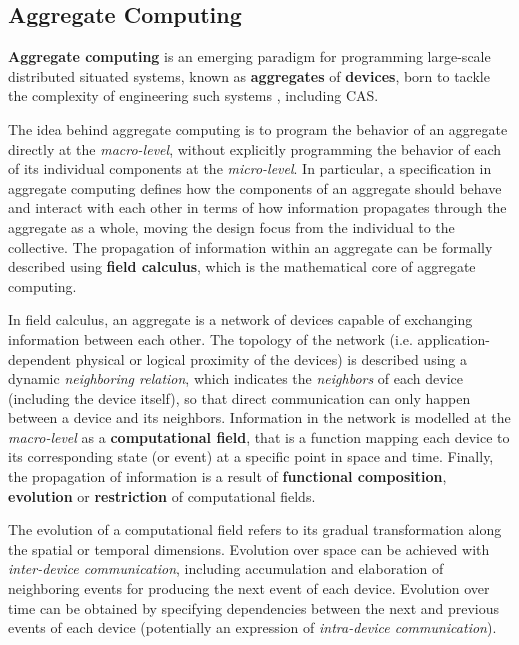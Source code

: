 \subsection{Aggregate Computing}

\textbf{Aggregate computing} is an emerging paradigm for programming large-scale
distributed situated systems, known as \textbf{aggregates} of \textbf{devices},
born to tackle the complexity of engineering such systems
\cite{FieldCalculus-AggregateComputing}, including \ac{CAS}.

The idea behind aggregate computing is to program the behavior of an aggregate
directly at the \textit{macro-level}, without explicitly programming the
behavior of each of its individual components at the \textit{micro-level}. In
particular, a specification in aggregate computing defines how the components
of an aggregate should behave and interact with each other in terms of how
information propagates through the aggregate as a whole, moving the design
focus from the individual to the collective. The propagation of information
within an aggregate can be formally described using \textbf{field calculus},
which is the mathematical core of aggregate computing.

In field calculus, an aggregate is a network of devices capable of exchanging
information between each other. The topology of the network (i.e.
application-dependent physical or logical proximity of the devices) is
described using a dynamic \textit{neighboring relation}, which indicates the
\textit{neighbors} of each device (including the device itself), so that direct
communication can only happen between a device and its neighbors. Information
in the network is modelled at the \textit{macro-level} as a
\textbf{computational field}, that is a function mapping each device to its
corresponding state (or event) at a specific point in space and time. Finally,
the propagation of information is a result of \textbf{functional composition},
\textbf{evolution} or \textbf{restriction} of computational fields.

The evolution of a computational field refers to its gradual transformation
along the spatial or temporal dimensions. Evolution over space can be achieved
with \textit{inter-device communication}, including accumulation and
elaboration of neighboring events for producing the next event of each device.
Evolution over time can be obtained by specifying dependencies between the next
and previous events of each device (potentially an expression of
\textit{intra-device communication}).

